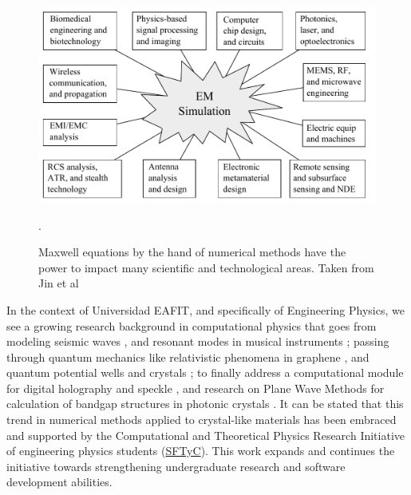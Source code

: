 \begin{figure}[h]
\centering
\includegraphics[scale=0.5]{./img/EM_simulation_applications.pdf}
\caption{Maxwell equations by the hand of numerical methods have the power to impact many scientific and technological areas. Taken from Jin et al \cite{Jin2010}}.
\label{fig:simulation_areas}
\end{figure}

In the context of Universidad EAFIT, and specifically of Engineering Physics, we see a growing research background in computational physics that goes from modeling seismic waves \cite{Guarin2012}, and resonant modes in musical instruments \cite{Rodriguez2012}; passing through quantum mechanics like relativistic phenomena in graphene \cite{Villegas2011}, and quantum potential wells and crystals \cite{Echeverri2011}; to finally address a computational module for digital holography and speckle \cite{Sierra2010}, and research on Plane Wave Methods for calculation of bandgap structures in photonic crystals \cite{Loaiza2011}. It can be stated that this trend in numerical methods applied to crystal-like materials has been embraced and supported by the Computational and Theoretical Physics Research Initiative of engineering physics students (\href{https://sites.google.com/site/fisicatyc/home}{SFTyC}). This work expands and continues the initiative towards strengthening undergraduate research and software development abilities. 



\pagebreak
